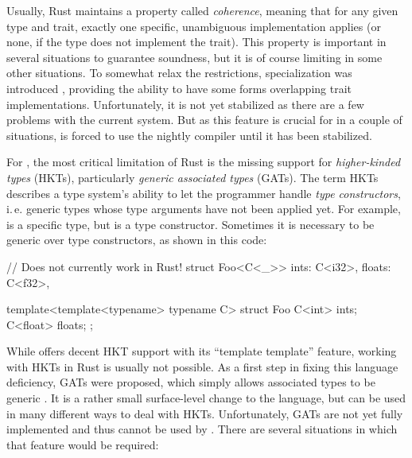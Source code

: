 Usually, Rust maintains a property called \emph{coherence}, meaning that for any given type and trait, exactly one specific, unambiguous implementation applies (or none, if the type does not implement the trait).
This property is important in several situations to guarantee soundness, but it is of course limiting in some other situations.
To somewhat relax the restrictions, specialization was introduced \cite{rfc1210}, providing the ability to have some forms overlapping trait implementations.
Unfortunately, it is not yet stabilized as there are a few problems with the current system.
But as this feature is crucial for  in a couple of situations,  is forced to use the nightly compiler until it has been stabilized.

\vfill

For , the most critical limitation of Rust is the missing support for \emph{higher-kinded types} (HKTs), particularly \emph{generic associated types} (GATs).
The term HKTs describes a type system's ability to let the programmer handle \emph{type constructors}, i.\,e. generic types whose type arguments have not been applied yet.
For example,  is a specific type, but  is a type constructor.
Sometimes it is necessary to be generic over type constructors, as shown in this code:

\vspace{5mm}
\begin{minipage}{0.47\textwidth}
  \begin{rustcode}
    // Does not currently work in Rust!
    struct Foo<C<_>> {
        ints: C<i32>,
        floats: C<f32>,
    }
  \end{rustcode}
\end{minipage}
\begin{minipage}{0.51\textwidth}
  \begin{cppcode}
    template<template<typename> typename C>
    struct Foo {
        C<int> ints;
        C<float> floats;
    };
  \end{cppcode}
\end{minipage}

\newpage
While \cpp offers decent HKT support with its \enquote{template template} feature, working with HKTs in Rust is usually not possible.
As a first step in fixing this language deficiency, GATs were proposed, which simply allows associated types to be generic \cite{rfc1598}.
It is a rather small surface-level change to the language, but can be used in many different ways to deal with HKTs.
Unfortunately, GATs are not yet fully implemented and thus cannot be used by .
There are several situations in which that feature would be required:

